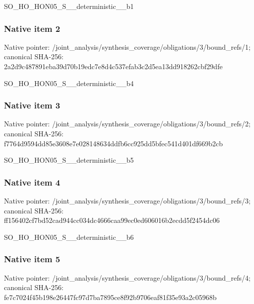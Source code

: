 \documentclass[10pt,a4paper]{article}
\begin{document}
\begingroup\raggedright\sloppy SO\_\allowbreak{}HO\_\allowbreak{}HON05\_\allowbreak{}S\_\allowbreak{}\_\allowbreak{}deterministic\_\allowbreak{}\_\allowbreak{}b1\par\endgroup

\subsubsection{Native item 2}
Native pointer: /joint\_\allowbreak{}analysis/synthesis\_\allowbreak{}coverage/obligations/3/bound\_\allowbreak{}refs/1; canonical SHA-256: 2a2d9c487891eba39d70b19edc7e8d4c537efab3c2d5ea13dd918262cbf29dfe

\begingroup\raggedright\sloppy SO\_\allowbreak{}HO\_\allowbreak{}HON05\_\allowbreak{}S\_\allowbreak{}\_\allowbreak{}deterministic\_\allowbreak{}\_\allowbreak{}b4\par\endgroup

\subsubsection{Native item 3}
Native pointer: /joint\_\allowbreak{}analysis/synthesis\_\allowbreak{}coverage/obligations/3/bound\_\allowbreak{}refs/2; canonical SHA-256: f7764d9594dd85e3608e7e028148634ddfb6cc925dd5bfec541d401df669b2cb

\begingroup\raggedright\sloppy SO\_\allowbreak{}HO\_\allowbreak{}HON05\_\allowbreak{}S\_\allowbreak{}\_\allowbreak{}deterministic\_\allowbreak{}\_\allowbreak{}b5\par\endgroup

\subsubsection{Native item 4}
Native pointer: /joint\_\allowbreak{}analysis/synthesis\_\allowbreak{}coverage/obligations/3/bound\_\allowbreak{}refs/3; canonical SHA-256: ff156402cf7bd52cad944cc034dc4666caa99ec0ed606016b2ecdd5f2454dc06

\begingroup\raggedright\sloppy SO\_\allowbreak{}HO\_\allowbreak{}HON05\_\allowbreak{}S\_\allowbreak{}\_\allowbreak{}deterministic\_\allowbreak{}\_\allowbreak{}b6\par\endgroup

\subsubsection{Native item 5}
Native pointer: /joint\_\allowbreak{}analysis/synthesis\_\allowbreak{}coverage/obligations/3/bound\_\allowbreak{}refs/4; canonical SHA-256: fe7c7024f45b198e26447fc97d7ba7895ce8f92b9706eaf81f35e93a2c05968b
\end{document}
